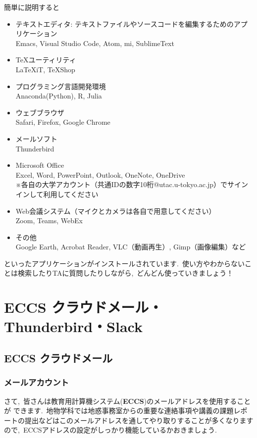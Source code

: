 \documentclass{jarticle}
\begin{document}
簡単に説明すると
\begin{itemize}
  \item テキストエディタ: テキストファイルやソースコードを編集するためのアプリケーション\\
    Emacs, Visual Studio Code, Atom, mi, SublimeText
  \item \TeX ユーティリティ\\
    LaTeXiT, TeXShop
  \item プログラミング言語開発環境\\
    Anaconda(Python), R, Julia
  \item ウェブブラウザ\\
    Safari, Firefox, Google Chrome
  \item メールソフト\\
    Thunderbird
  \item Microsoft Office\\
    Excel, Word, PowerPoint, Outlook, OneNote, OneDrive\\
    ※各自の大学アカウント（共通IDの数字10桁@utac.u-tokyo.ac.jp）でサインインして利用してください
  \item Web会議システム（マイクとカメラは各自で用意してください）\\
    Zoom, Teams, WebEx
  \item その他\\
    Google Earth, Acrobat Reader, VLC（動画再生）, Gimp（画像編集）など
\end{itemize}
といったアプリケーションがインストールされています.\ 
使い方やわからないことは検索したりTAに質問したりしながら,\ どんどん使っていきましょう！

\newpage
\section{ECCS クラウドメール・Thunderbird・Slack}
\subsection{ECCS クラウドメール}
\subsubsection{メールアカウント}
さて,\ 皆さんは教育用計算機システム({\bf ECCS})のメールアドレスを使用することが
できます.\ 
地物学科では地惑事務室からの重要な連絡事項や講義の課題レポートの提出などはこのメールアドレスを通してやり取りすることが多くなりますので,\ ECCSアドレスの設定がしっかり機能しているかおきましょう.\ 
\end{document}
